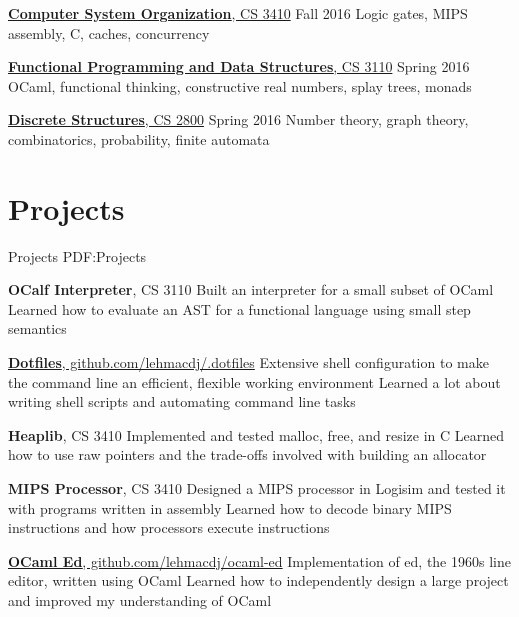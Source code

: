 \documentclass[letterpaper,10pt,oneside]{simpleresume}
\begin{document}
\begin{minipage}[t][0pt]{\linewidth}
\begin{body}
\href{https://www.cs.cornell.edu/courses/cs3410/2016fa/}
{\textbf{Computer System Organization}, CS 3410}
\hfill Fall 2016
\BulletItem%
Logic gates, MIPS assembly, C, caches, concurrency

\href{https://www.cs.cornell.edu/courses/cs3110/2016sp/}
{\textbf{Functional Programming and Data Structures}, CS 3110}
\hfill Spring 2016
\BulletItem%
OCaml, functional thinking, constructive real numbers, splay trees, monads

\href{https://www.cs.cornell.edu/courses/cs2800/2016sp/}
{\textbf{Discrete Structures}, CS 2800}
\hfill Spring 2016
\BulletItem%
Number theory, graph theory, combinatorics, probability, finite automata

\section%
{Projects}
{Projects}
{PDF:Projects}

\textbf{OCalf Interpreter}, CS 3110
\BulletItem%
Built an interpreter for a small subset of OCaml
\BulletItem%
Learned how to evaluate an AST for a functional language using small step
semantics

\href{https://www.github.com/lehmacdj/.dotfiles}
{\textbf{Dotfiles}, github.com/lehmacdj/.dotfiles}
\BulletItem%
Extensive shell configuration to make the command line an efficient, flexible
working environment
\BulletItem%
Learned a lot about writing shell scripts and automating command line tasks

\textbf{Heaplib}, CS 3410
\BulletItem%
Implemented and tested malloc, free, and resize in C
\BulletItem%
Learned how to use raw pointers and the trade-offs involved with building
an allocator

\textbf{MIPS Processor}, CS 3410
\BulletItem%
Designed a MIPS processor in Logisim and tested it with programs written in
assembly
\BulletItem%
Learned how to decode binary MIPS instructions and how processors execute
instructions

\href{https://www.github.com/lehmacdj/ocaml-ed}
{\textbf{OCaml Ed}, github.com/lehmacdj/ocaml-ed}
\BulletItem%
Implementation of ed, the 1960s line editor, written using OCaml
\BulletItem%
Learned how to independently design a large project and improved my
understanding of OCaml



\end{body}
\end{minipage}
\end{document}
